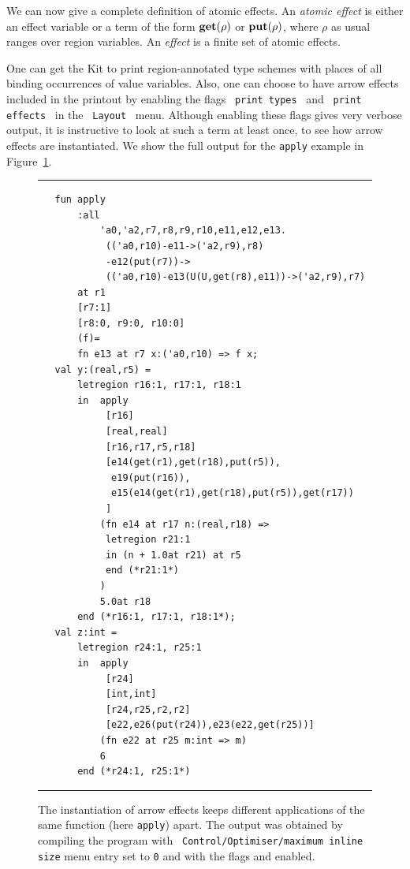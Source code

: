 \documentclass[12pt]{book}
\begin{document}
We can now give a complete definition of atomic effects.  An
%
{\em atomic effect\/} is either an effect variable or a term of the
form $\mathop{\bf get}\nolimits(\rho)$ or $\mathop{\bf put}\nolimits(\rho)$, where $\rho$ as usual ranges over
region variables. An 
%
{\em effect\/} is a finite set of atomic effects.

One can get the Kit to print region-annotated 
%
%
type schemes with places of all binding occurrences of value
variables.  Also, one can choose to have arrow effects included in the
printout by enabling the flags ~\texttt{print types}~ and
~\texttt{print effects}~ in the ~\texttt{Layout}~ menu. Although
enabling these flags gives very verbose output, it is instructive to
look at such a term at least once, to see how arrow effects are
instantiated. We show the full output for the {\tt apply} example in
Figure~\ref{apply.fig}.

\begin{figure}
\hrule \medskip
\begin{verbatim} 
   fun apply 
       :all 
           'a0,'a2,r7,r8,r9,r10,e11,e12,e13.
            (('a0,r10)-e11->('a2,r9),r8)
            -e12(put(r7))->
            (('a0,r10)-e13(U(U,get(r8),e11))->('a2,r9),r7) 
       at r1 
       [r7:1] 
       [r8:0, r9:0, r10:0] 
       (f)= 
       fn e13 at r7 x:('a0,r10) => f x; 
   val y:(real,r5) = 
       letregion r16:1, r17:1, r18:1 
       in  apply
            [r16] 
            [real,real] 
            [r16,r17,r5,r18] 
            [e14(get(r1),get(r18),put(r5)),
             e19(put(r16)),
             e15(e14(get(r1),get(r18),put(r5)),get(r17))
            ] 
           (fn e14 at r17 n:(real,r18) => 
            letregion r21:1 
            in (n + 1.0at r21) at r5 
            end (*r21:1*)
           ) 
           5.0at r18 
       end (*r16:1, r17:1, r18:1*); 
   val z:int = 
       letregion r24:1, r25:1 
       in  apply
            [r24] 
            [int,int] 
            [r24,r25,r2,r2] 
            [e22,e26(put(r24)),e23(e22,get(r25))] 
           (fn e22 at r25 m:int => m) 
           6 
       end (*r24:1, r25:1*)
\end{verbatim}
\caption{The instantiation of arrow effects keeps different applications of
  the same function (here {\tt apply}) apart. The output was obtained
  by compiling the program  with {\tt
    Control/Optimiser/maximum inline size} menu entry set to {\tt 0}
  and with the flags  and 
  enabled.}  \medskip \hrule
\label{apply.fig}
\end{figure}
\end{document}
